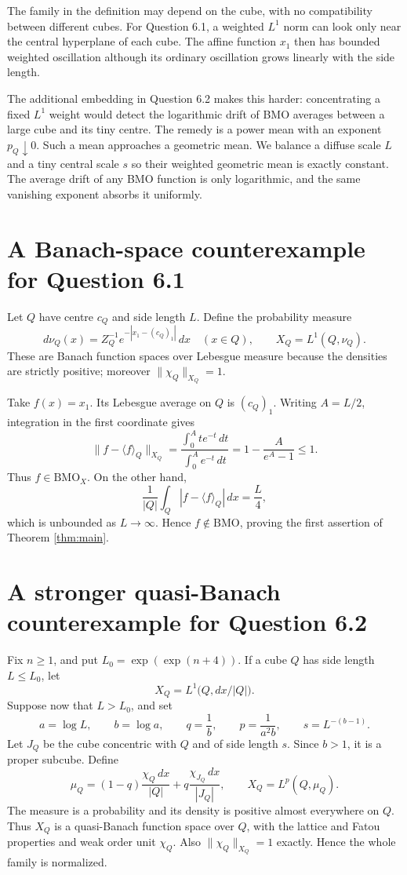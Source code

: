 \documentclass[10pt]{article}
\newcommand{\BMO}{\mathrm{BMO}}
\newcommand{\avg}[1]{\langle #1\rangle}
\begin{document}
The family in the definition may depend on the cube, with no compatibility
between different cubes.  For Question 6.1, a weighted $L^1$ norm can look
only near the central hyperplane of each cube.  The affine function $x_1$
then has bounded weighted oscillation although its ordinary oscillation grows
linearly with the side length.

The additional embedding in Question 6.2 makes this harder: concentrating a
fixed $L^1$ weight would detect the logarithmic drift of BMO averages
between a large cube and its tiny centre.  The remedy is a power mean with an
exponent $p_Q\downarrow0$.  Such a mean approaches a geometric mean.  We
balance a diffuse scale $L$ and a tiny central scale $s$ so their weighted
geometric mean is exactly constant.  The average drift of any BMO function is
only logarithmic, and the same vanishing exponent absorbs it uniformly.

\section*{A Banach-space counterexample for Question 6.1}

Let $Q$ have centre $c_Q$ and side length $L$.  Define the probability
measure
\[
 d\nu_Q(x)=Z_Q^{-1}e^{-|x_1-(c_Q)_1|}\,dx\quad(x\in Q),
 \qquad X_Q=L^1(Q,\nu_Q).
\]
These are Banach function spaces over Lebesgue measure because the densities
are strictly positive; moreover \(\|\chi_Q\|_{X_Q}=1\).

Take $f(x)=x_1$.  Its Lebesgue average on $Q$ is $(c_Q)_1$.  Writing
\(A=L/2\), integration in the first coordinate gives
\[
 \|f-\avg f_Q\|_{X_Q}
 =\frac{\int_0^A t e^{-t}\,dt}{\int_0^A e^{-t}\,dt}
 =1-\frac{A}{e^A-1}\le1.
\]
Thus $f\in\BMO_X$.  On the other hand,
\[
 \frac1{|Q|}\int_Q|f-\avg f_Q|\,dx=\frac{L}{4},
\]
which is unbounded as $L\to\infty$.  Hence $f\notin\BMO$, proving the
first assertion of Theorem \ref{thm:main}.

\section*{A stronger quasi-Banach counterexample for Question 6.2}

Fix $n\ge1$, and put $L_0=\exp(\exp(n+4))$.  If a cube $Q$ has side
length $L\le L_0$, let
\[
 X_Q=L^1\bigl(Q,dx/|Q|\bigr).
\]
Suppose now that $L>L_0$, and set
\begin{equation}\label{eq:parameters}
 a=\log L,\qquad b=\log a,\qquad q=\frac1b,
 \qquad p=\frac1{a^2b},\qquad s=L^{-(b-1)}.
\end{equation}
Let $J_Q$ be the cube concentric with $Q$ and of side length $s$.  Since
\(b>1\), it is a proper subcube.  Define
\begin{equation}\label{eq:measure}
 \mu_Q=(1-q)\frac{\chi_Q\,dx}{|Q|}
       +q\frac{\chi_{J_Q}\,dx}{|J_Q|},
 \qquad X_Q=L^p(Q,\mu_Q).
\end{equation}
The measure is a probability and its density is positive almost everywhere
on $Q$.  Thus $X_Q$ is a quasi-Banach function space over $Q$, with the
lattice and Fatou properties and weak order unit \(\chi_Q\).  Also
\(\|\chi_Q\|_{X_Q}=1\) exactly.  Hence the whole family is normalized.
\end{document}
